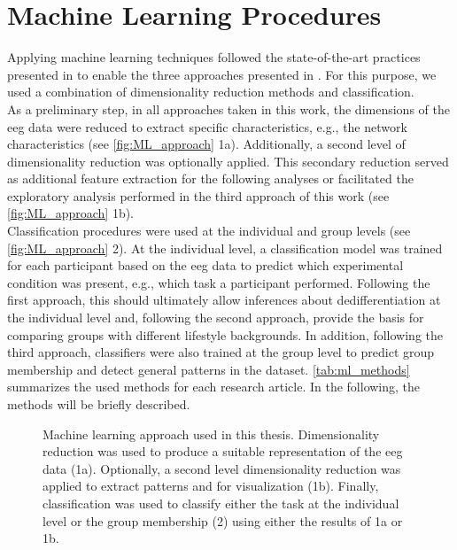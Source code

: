 \section{Machine Learning Procedures}
Applying machine learning techniques followed the state-of-the-art practices presented in  to enable the three approaches presented in . For this purpose, we used a combination of dimensionality reduction methods and classification.\\
As a preliminary step, in all approaches taken in this work, the dimensions of the \gls{eeg} data were reduced to extract specific characteristics, e.g., the network characteristics (see \autoref{fig:ML_approach} 1a). Additionally, a second level of dimensionality reduction was optionally applied. This secondary reduction served as additional feature extraction for the following analyses or facilitated the exploratory analysis performed in the third approach of this work (see \autoref{fig:ML_approach} 1b).\\
Classification procedures were used at the individual and group levels (see \autoref{fig:ML_approach} 2). At the individual level, a classification model was trained for each participant based on the \gls{eeg} data to predict which experimental condition was present, e.g., which task a participant performed. Following the first approach, this should ultimately allow inferences about dedifferentiation at the individual level and, following the second approach, provide the basis for comparing groups with different lifestyle backgrounds. In addition, following the third approach, classifiers were also trained at the group level to predict group membership and detect general patterns in the dataset. \autoref{tab:ml_methods}  summarizes the used methods for each research article. In the following, the methods will be briefly described.

\begin{figure}[ht]
\begin{center}

\captionsetup{justification=justified}
\caption[Machine learning approach used in this thesis]{Machine learning approach used in this thesis. Dimensionality reduction was used to produce a suitable representation of the \gls{eeg} data (1a). Optionally, a second level dimensionality reduction was applied to extract patterns and for visualization (1b). Finally, classification was used to classify either the task at the individual level or the group membership (2) using either the results of 1a or 1b.}
\label{fig:ML_approach}
\end{center}
\end{figure}

